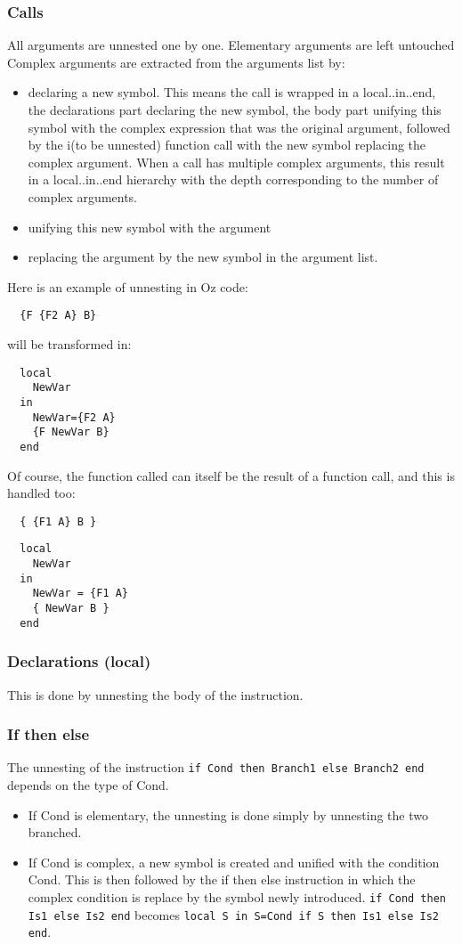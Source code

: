 \documentclass[a4paper]{memoir}
\begin{document}
\begin{description}
\end{description}
\subsubsection{Calls}\label{sec:unnester:calls}
All arguments are unnested one by one. Elementary arguments are left untouched
Complex arguments are extracted from the arguments list by:
\begin{itemize}
  \item declaring a new symbol. This means the call is wrapped in a local..in..end, the declarations part declaring the new symbol, the body part unifying this symbol with the complex expression that was the original argument, followed by the i(to be unnested) function call with the new symbol replacing the complex argument. When a call has multiple complex arguments, this result in a local..in..end hierarchy with the depth corresponding to the number of complex arguments.
  \item unifying this new symbol with the argument
  \item replacing the argument by the new symbol in the argument list.
\end{itemize}
Here is an example of unnesting in Oz code:
\begin{lstlisting}
  {F {F2 A} B}
\end{lstlisting}
will be transformed in:
\begin{lstlisting}
  local
    NewVar
  in
    NewVar={F2 A}
    {F NewVar B}
  end
\end{lstlisting}

Of course, the function called can itself be the result of a function call, and this is handled too:
\begin{lstlisting}
  { {F1 A} B }
\end{lstlisting}
\begin{lstlisting}
  local
    NewVar
  in
    NewVar = {F1 A}
    { NewVar B }
  end
\end{lstlisting}

\subsubsection{Declarations (local)}
This is done by unnesting the body of the instruction.
\subsubsection{If then else}
The unnesting of the instruction \lstinline!if Cond then Branch1 else Branch2 end! depends on the type of Cond. 
\begin{itemize}
  \item If Cond is elementary, the unnesting is done simply by unnesting the two branched.
  \item If Cond is complex, a new symbol is created and unified with the condition Cond. This is then followed by the if then else instruction in which the complex condition is replace by the symbol newly introduced.
    \lstinline!if Cond then Is1 else Is2 end! becomes \lstinline!local S in S=Cond if S then Is1 else Is2 end!.
\end{itemize}
\end{document}
